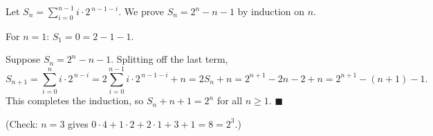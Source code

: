 Let $S_n=\displaystyle\sum_{i=0}^{n-1}i\cdot2^{\,n-1-i}$. We prove $S_n=2^n-n-1$ by induction on $n$.

For $n=1$: $S_1=0=2-1-1$.

Suppose $S_n=2^n-n-1$. Splitting off the last term,
\[S_{n+1}=\sum_{i=0}^{n}i\cdot2^{\,n-i}=2\sum_{i=0}^{n-1}i\cdot2^{\,n-1-i}+n=2S_n+n=2^{n+1}-2n-2+n=2^{n+1}-(n+1)-1 .\]
This completes the induction, so $S_n+n+1=2^n$ for all $n\ge1$. $\blacksquare$

(Check: $n=3$ gives $0\cdot4+1\cdot2+2\cdot1+3+1=8=2^3$.)
